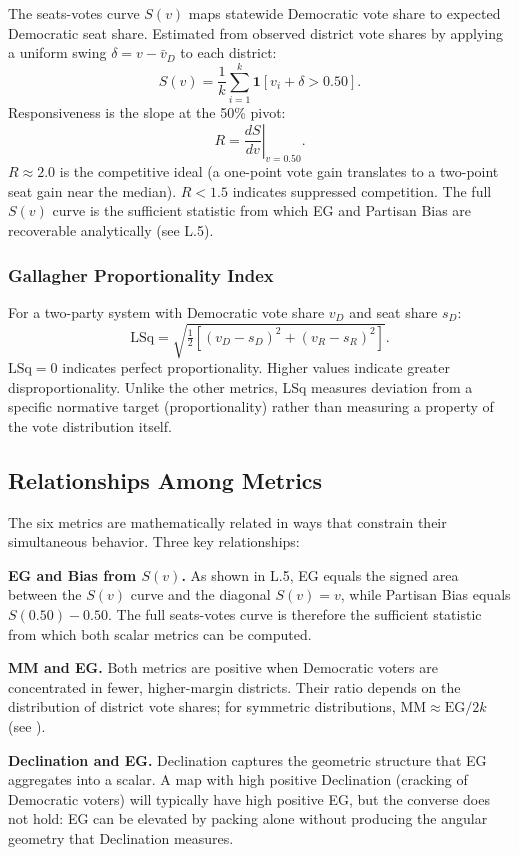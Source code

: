 The seats-votes curve $S(v)$ maps statewide Democratic vote share to expected
Democratic seat share. Estimated from observed district vote shares by applying
a uniform swing $\delta = v - \bar{v}_D$ to each district:
\[
S(v) = \frac{1}{k}\sum_{i=1}^k \mathbf{1}[v_i + \delta > 0.50].
\]
Responsiveness is the slope at the 50\% pivot:
\[
R = \left.\frac{dS}{dv}\right|_{v=0.50}.
\]
$R \approx 2.0$ is the competitive ideal (a one-point vote gain translates to a
two-point seat gain near the median). $R < 1.5$ indicates suppressed competition.
The full $S(v)$ curve is the sufficient statistic from which EG and Partisan Bias
are recoverable analytically (see L.5).

\subsubsection{Gallagher Proportionality Index}

For a two-party system with Democratic vote share $v_D$ and seat share $s_D$:
\[
\text{LSq} = \sqrt{\tfrac{1}{2}\left[(v_D - s_D)^2 + (v_R - s_R)^2\right]}.
\]
$\text{LSq} = 0$ indicates perfect proportionality. Higher values indicate
greater disproportionality. Unlike the other metrics, LSq measures deviation
from a specific normative target (proportionality) rather than measuring
a property of the vote distribution itself.

\subsection{Relationships Among Metrics}

The six metrics are mathematically related in ways that constrain their simultaneous
behavior. Three key relationships:

\textbf{EG and Bias from $S(v)$.} As shown in L.5, EG equals the signed area
between the $S(v)$ curve and the diagonal $S(v) = v$, while Partisan Bias equals
$S(0.50) - 0.50$. The full seats-votes curve is therefore the sufficient statistic
from which both scalar metrics can be computed.

\textbf{MM and EG.} Both metrics are positive when Democratic voters are
concentrated in fewer, higher-margin districts. Their ratio depends on the
distribution of district vote shares; for symmetric distributions, $\text{MM}
\approx \text{EG}/2k$ (see \citealt{mcGhee2017}).

\textbf{Declination and EG.} Declination captures the geometric structure that
EG aggregates into a scalar. A map with high positive Declination (cracking of
Democratic voters) will typically have high positive EG, but the converse does
not hold: EG can be elevated by packing alone without producing the angular
geometry that Declination measures.


